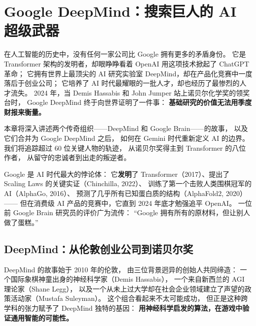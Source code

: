 \chapter{Google DeepMind：搜索巨人的 AI 超级武器}
\label{ch:google}


在人工智能的历史中，没有任何一家公司比 Google 拥有更多的矛盾身份。
它是 Transformer 架构的发明者，却眼睁睁看着 OpenAI 用这项技术掀起了 ChatGPT 革命；
它拥有世界上最顶尖的 AI 研究实验室 DeepMind，却在产品化竞赛中一度落后于创业公司；
它培养了 AI 时代最耀眼的一批人才，却也经历了最惨烈的人才流失。
2024 年，当 Demis Hassabis 和 John Jumper 站上诺贝尔化学奖的领奖台时，
Google DeepMind 终于向世界证明了一件事：
\textbf{基础研究的价值无法用季度财报来衡量。}

本章将深入讲述两个传奇组织——DeepMind 和 Google Brain——的故事，
以及它们合并为 Google DeepMind 之后，
如何在 Gemini 时代重新定义 AI 的边界。
我们将追踪超过 60 位关键人物的轨迹，
从诺贝尔奖得主到 Transformer 的八位作者，
从留守的忠诚者到出走的叛逆者。

\begin{keybox}[Google 的 AI 悖论]
Google 是 AI 时代最大的悖论体：
它\textbf{发明}了 Transformer（2017）、提出了 Scaling Laws 的关键实证（Chinchilla, 2022）、
训练了第一个击败人类围棋冠军的 AI（AlphaGo, 2016）、
预测了几乎所有已知蛋白质的结构（AlphaFold2, 2020）——
但在消费级 AI 产品的竞赛中，它直到 2024 年底才勉强追平 OpenAI。
一位前 Google Brain 研究员的评价广为流传：
``Google 拥有所有的原材料，但让别人做了蛋糕。''
\end{keybox}


\section{DeepMind：从伦敦创业公司到诺贝尔奖}
\label{sec:deepmind-origin}

DeepMind 的故事始于 2010 年的伦敦，
由三位背景迥异的创始人共同缔造：
一个国际象棋神童出身的神经科学家（Demis Hassabis），
一个来自新西兰的 AGI 理论家（Shane Legg），
以及一个从未上过大学却在社会企业领域建立了声望的政策活动家（Mustafa Suleyman）。
这个组合看起来不太可能成功，
但正是这种跨学科的张力赋予了 DeepMind 独特的基因：
\textbf{用神经科学启发的算法，在游戏中验证通用智能的可能性。}

